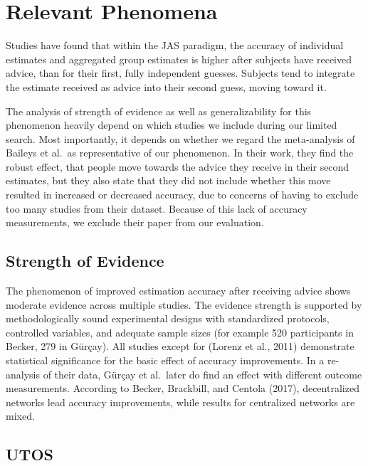\documentclass[
  man,floatsintext]{apa6}
\begin{document}
\hypertarget{relevant-phenomena}{%
\section{Relevant Phenomena}\label{relevant-phenomena}}

Studies have found that within the JAS paradigm, the accuracy of individual estimates and aggregated group estimates is higher after subjects have received advice, than for their first, fully independent guesses. Subjects tend to integrate the estimate received as advice into their second guess, moving toward it.

The analysis of strength of evidence as well as generalizability for this phenomenon heavily depend on which studies we include during our limited search. Most importantly, it depends on whether we regard the meta-analysis of Baileys et al.~as representative of our phenomenon. In their work, they find the robust effect, that people move towards the advice they receive in their second estimates, but they also state that they did not include whether this move resulted in increased or decreased accuracy, due to concerns of having to exclude too many studies from their dataset. Because of this lack of accuracy measurements, we exclude their paper from our evaluation.

\hypertarget{strength-of-evidence}{%
\subsection{Strength of Evidence}\label{strength-of-evidence}}

The phenomenon of improved estimation accuracy after receiving advice shows moderate evidence across multiple studies. The evidence strength is supported by methodologically sound experimental designs with standardized protocols, controlled variables, and adequate sample sizes (for example 520 participants in Becker, 279 in Gürçay). All studies except for (Lorenz et al., 2011) demonstrate statistical significance for the basic effect of accuracy improvements. In a re-analysis of their data, Gürçay et al.~later do find an effect with different outcome measurements. According to Becker, Brackbill, and Centola (2017), decentralized networks lead accuracy improvements, while results for centralized networks are mixed.

\hypertarget{utos}{%
\subsection{UTOS}\label{utos}}
\end{document}
